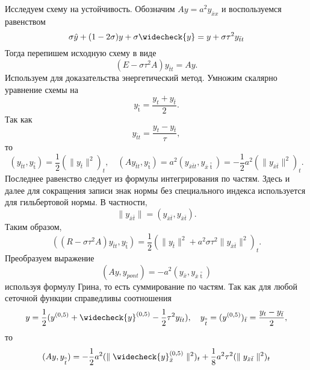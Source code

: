 \documentclass[12pt, a4paper]{article}
\newcommand{\down}[1]{\widecheck{#1}}
\newcommand{\pon}[1]{\mathop {#1}\limits^ \circ}
\begin{document}
	Исследуем схему на устойчивость. Обозначим $Ay = a^2 y_{\bar{x}x}$ и воспользуемся равенством
	\begin{equation*}
		\sigma \hat{y} + (1 - 2 \sigma) y + \sigma \widecheck{y} = y + \sigma \tau^2 y_{\bar{t}t}
	\end{equation*}
	Тогда перепишем исходную схему в виде
	\begin{equation*}
		(E - \sigma \tau^2 A)y_{\bar{t}t} = Ay.
	\end{equation*}
	Используем для доказательства энергетический метод. Умножим скалярно уравнение схемы на 
	\begin{equation*}
		y_{\pon{t}} = \frac{y_t + y_{\bar{t}}}{2}. 
	\end{equation*}
	Так как 
	\begin{equation*}
		y_{\bar{t}t} = \frac{y_t - y_{\bar{t}}}{\tau},
	\end{equation*}
	то 
	\begin{equation*}
		(y_{\bar{t}t}, y_{\pon{t}}) = \frac{1}{2} (\parallel y_{\bar{t}} \parallel^2)_t, \quad (A y_{\bar{t}t}, y_{\pon{t}}) = a^2 (y_{\bar{x} \bar{t} t}, y_{\bar{x} \pon{t}}) = - \frac{1}{2} a^2 (\parallel y_{\bar{x} \bar{t}} \parallel^2)_t.
	\end{equation*}
	Последнее равенство следует из формулы интегрирования по частям. Здесь и далее для сокращения записи знак нормы без специального индекса используется для гильбертовой нормы. В частности,
	\begin{equation*}
		\parallel y_{\bar{x} \bar{t}} \parallel = ( y_{\bar{x} \bar{t}},  y_{\bar{x} \bar{t}}).
	\end{equation*}
	 Таким образом, 
	 \begin{equation*}
	 	((R - \sigma \tau^2 A) y_{\bar{t}t}, y_{\pon{t}}) = \frac{1}{2} (\parallel y_{\bar{t}} \parallel^2 + a^2 \sigma \tau^2 \parallel y_{\bar{x}\bar{t}} \parallel^2)_t.
	\end{equation*}
	Преобразуем выражение 
	\begin{equation*}
		(Ay, y_{pon{t}}) = -a^2 (y_{\bar{x}}, y_{\bar{x} \pon{t}})
	\end{equation*}
	используя формулу Грина, то есть суммирование по частям. Так как для любой сеточной функции справедливы соотношения
	\begin{equation*}
		y = \frac{1}{2} (y^{(0, 5)} +  \down{y}^{(0, 5)} - \frac{1}{2} \tau^2 y_{\bar{t}t}), \quad y_{\pon{t}} = (y^{(0, 5)})_{\bar{t}} = \frac{y_t - y_{\bar{t}}}{2},
	\end{equation*}
	то
	\begin{equation*}
		(Ay, y_{\pon{t}}) = -\frac{1}{2} a^2 (\parallel \down{y}^{(0,5)}_{\bar{x}}\parallel^2)_t + \frac{1}{8} a^2 \tau^2 (\parallel y_{\bar{x}\bar{t}}\parallel^2)_t
	\end{equation*}
\end{document}

